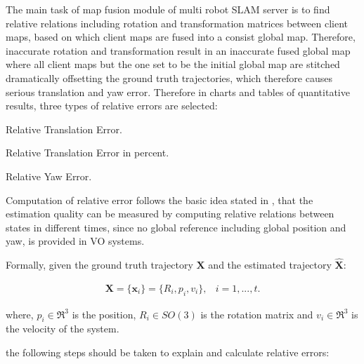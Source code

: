 The main task of map fusion module of multi robot SLAM server is to find relative relations including rotation and transformation matrices between client maps, based on which client maps are fused into a consist global map. Therefore, inaccurate rotation and transformation result in an inaccurate fused global map where all client maps but the one set to be the initial global map are stitched dramatically offsetting the ground truth trajectories, which therefore causes serious translation and yaw error. Therefore in charts and tables of quantitative results, three types of relative errors are selected: 

\begin{inparaenum}
	\item Relative Translation Error.

	\item Relative Translation Error in percent. 
	
	\item Relative Yaw Error.
\end{inparaenum}

Computation of relative error follows the basic idea stated in \cite{zhang2018tutorial}, that the estimation quality can be measured by computing relative relations between states in different times, since no global reference including global position and yaw, is provided in VO systems.

Formally, given the ground truth trajectory ${\bm{X}}$ and the estimated trajectory $\hat{\bm{X}}$:

\begin{equation}
\begin{array}{lr}
{\bm{X}}=\{\bm{x}_{i}\}=\{R_i, p_i, v_i\}, & i=1,...,t.
\end{array}
\end{equation}

where, $p_i\in\Re^3$ is the position, $R_i\in{SO(3)}$ is the rotation matrix and $v_i\in\Re^{3}$ is the velocity of the system. 

 the following steps should be taken to explain and calculate relative errors:

